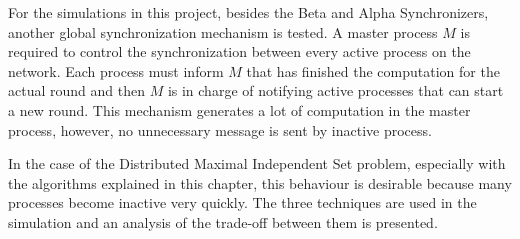 For the simulations in this project, besides the Beta and Alpha Synchronizers, another global synchronization mechanism is tested. A master process $M$ is required to control the synchronization between every active process on the network.  Each process must inform $M$ that has finished the computation for the actual round and then $M$ is in charge of notifying active processes that can start a new round. This mechanism generates a lot of computation in the master process, however, no unnecessary message is sent by inactive process. 

In the case of the Distributed Maximal Independent Set problem, especially with the algorithms explained in this chapter, this behaviour is desirable because many processes become inactive very quickly. The three techniques are used in the simulation and an analysis of the trade-off between them is presented.

\newpage



